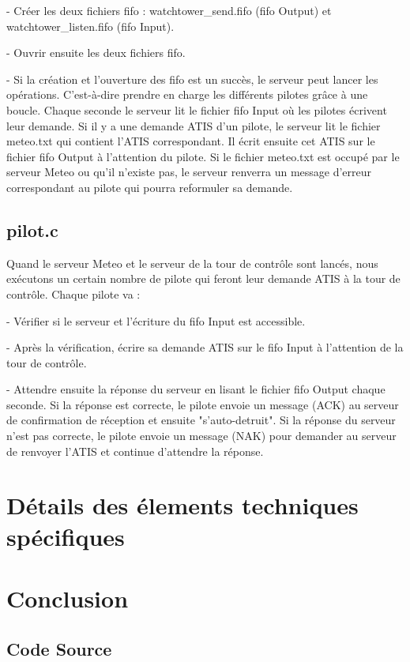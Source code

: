 \documentclass{report}
\begin{document}
{- Créer les deux fichiers fifo : watchtower\_send.fifo (fifo Output) et watchtower\_listen.fifo (fifo Input).

- Ouvrir ensuite les deux fichiers fifo.

- Si la création et l'ouverture des fifo est un succès, le serveur peut lancer les opérations. C'est-à-dire prendre en charge les différents pilotes grâce à une boucle.
Chaque seconde le serveur lit le fichier fifo Input où les pilotes écrivent leur demande. Si il y a une demande ATIS d'un pilote, le serveur lit le fichier meteo.txt qui contient l'ATIS correspondant. Il écrit ensuite cet ATIS sur le fichier fifo Output à l'attention du pilote. Si le fichier meteo.txt est occupé par le serveur Meteo ou qu'il n'existe pas, le serveur renverra un message d'erreur correspondant au pilote qui pourra reformuler sa demande.

	\section{pilot.c}
		
	Quand le serveur Meteo et le serveur de la tour de contrôle sont lancés, nous exécutons un certain nombre de pilote qui feront leur demande ATIS à la tour de contrôle.
	Chaque pilote va : 
	
	- Vérifier si le serveur et l'écriture du fifo Input est accessible.
	
	- Après la vérification, écrire sa demande ATIS sur le fifo Input à l'attention de la tour de contrôle.
	
	- Attendre ensuite la réponse du serveur en lisant le fichier fifo Output chaque seconde. Si la réponse est correcte, le pilote envoie un message (ACK) au serveur de confirmation de réception et ensuite "s'auto-detruit".  Si la réponse du serveur n'est pas correcte, le pilote envoie un message (NAK) pour demander au serveur de renvoyer l'ATIS et continue d'attendre la réponse.
		
\chapter{Détails des élements techniques spécifiques}
\chapter{Conclusion}

\begin{appendices}

\chapter{Code Source}

\end{appendices}}
\end{document}
